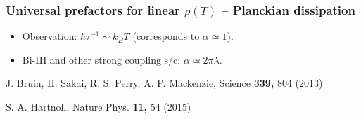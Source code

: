 \begin{frame}
  \frametitle{Universal prefactors for linear $\rho(T)$ -- Planckian dissipation}
  \centerline{}
  
  \begin{itemize}
  \item <visible@1-> Observation: $\hbar \tau^{-1} \sim k_B
    T$ (corresponds to $\alpha \simeq 1$).
  
  \item <visible@2-> Bi-III and other strong coupling s/c: $\alpha
    \simeq 2\pi \lambda$.
  \end{itemize}
  
  \vspace*{\fill}
  \centerline{\makebox[\linewidth]{\rule{0.85\textwidth}{0.4pt}}}
  \centerline{\scriptsize J. Bruin, H. Sakai, R. S. Perry, A. P. Mackenzie, Science {\bf 339,} 804 (2013)} 
  \centerline{\scriptsize S. A. Hartnoll, Nature Phys. {\bf 11,} 54 (2015)} 
  
  \end{frame}
  
  
